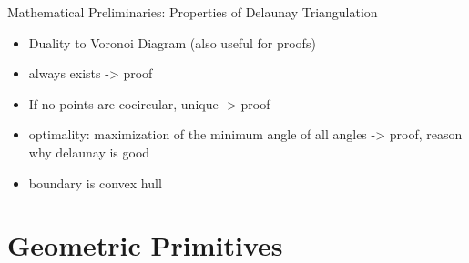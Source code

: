 \documentclass[aspectratio=169]{beamer}
\begin{document}
  \begin{frame}{Mathematical Preliminaries: Properties of Delaunay Triangulation}
    \begin{itemize}
      \item Duality to Voronoi Diagram (also useful for proofs)
      \item always exists -> proof
      \item If no points are cocircular, unique -> proof
      \item optimality: maximization of the minimum angle of all angles -> proof, reason why delaunay is good
      \item boundary is convex hull
    \end{itemize}
  \end{frame}

\section{Geometric Primitives}
\end{document}

